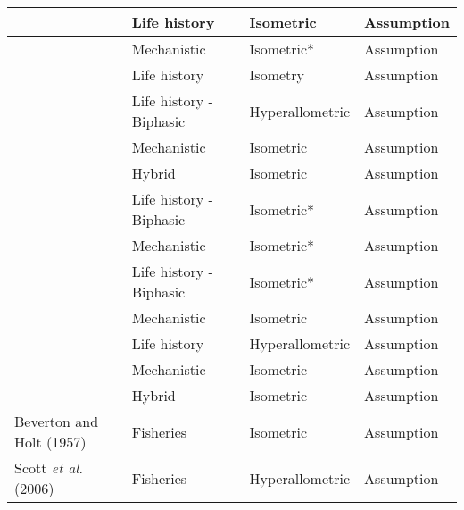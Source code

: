 \documentclass[a4paper]{article} %
\begin{document}
\begin{table}[H]
\begin{tabular}{|l|l|l|l|}
    \textcite{Pecquerie2009}                & Life history              & Isometric        & Assumption                     \\ \hline
    \textcite{kooijman2010dynamic}          & Mechanistic               & Isometric*       & Assumption                     \\ \hline
    \textcite{Arendt2011}                   & Life history              & Isometry         & Assumption                     \\ \hline
    \textcite{Ohnishi2011}                  & Life history - Biphasic   & Hyperallometric  & Assumption                     \\ \hline
    \textcite{Brunel2013}                   & Mechanistic               & Isometric        & Assumption                     \\ \hline
    \textcite{Charnov2013}                  & Hybrid                    & Isometric        & Assumption                     \\ \hline
    \textcite{Boukal2014}                   & Life history - Biphasic   & Isometric*       & Assumption                     \\ \hline
    \textcite{Kooijman2014a}                & Mechanistic               & Isometric*       & Assumption                     \\ \hline
    \textcite{Minte-Vera2016a}              & Life history - Biphasic   & Isometric*       & Assumption                     \\ \hline
    \textcite{Jusup2017}                    & Mechanistic               & Isometric        & Assumption                     \\ \hline
    \textcite{Mangel2017}                   & Life history              & Hyperallometric  & Assumption                     \\ \hline
    \textcite{Smallegange2017}              & Mechanistic               & Isometric        & Assumption                     \\ \hline
    \textcite{Audzijonyte2018}              & Hybrid                    & Isometric        & Assumption                     \\ \hline
    Beverton and Holt (1957)            & Fisheries                 & Isometric        & Assumption                     \\ \hline
    Scott \textit{et al}. (2006)        & Fisheries                 & Hyperallometric  & Assumption                     \\ \hline

\end{tabular}
\end{table}
\end{document}

